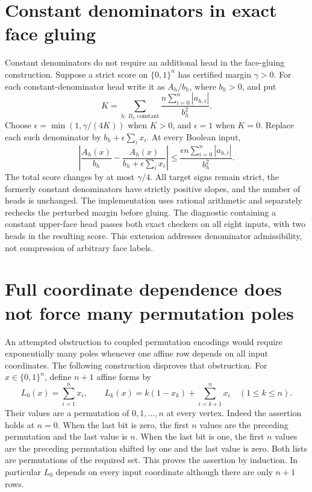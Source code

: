 \documentclass[11pt]{article}
\begin{document}
\section{Constant denominators in exact face gluing}

Constant denominators do not require an additional head in the face-gluing
construction. Suppose a strict score on $\{0,1\}^n$ has certified margin
$\gamma>0$. For each constant-denominator head write it as $A_h/b_h$,
where $b_h>0$, and put
\[
 K=\sum_{h:\,B_h\text{ constant}}\frac{n\sum_{i=0}^n|a_{h,i}|}{b_h^2}.
\]
Choose $\epsilon=\min(1,\gamma/(4K))$ when $K>0$, and $\epsilon=1$
when $K=0$. Replace each such denominator by
$b_h+\epsilon\sum_i x_i$. At every Boolean input,
\[
 \left|\frac{A_h(x)}{b_h}-\frac{A_h(x)}{b_h+\epsilon\sum_i x_i}\right|
 \le\frac{\epsilon n\sum_{i=0}^n|a_{h,i}|}{b_h^2}.
\]
The total score changes by at most $\gamma/4$. All target signs remain
strict, the formerly constant denominators have strictly positive slopes,
and the number of heads is unchanged. The implementation uses rational
arithmetic and separately rechecks the perturbed margin before gluing.
The diagnostic containing a constant upper-face head passes both exact
checkers on all eight inputs, with two heads in the resulting score.
This extension addresses denominator admissibility, not compression of
arbitrary face labels.


\section{Full coordinate dependence does not force many permutation poles}

An attempted obstruction to coupled permutation encodings would require
exponentially many poles whenever one affine row depends on all input
coordinates. The following construction disproves that obstruction.
For $x\in\{0,1\}^n$, define $n+1$ affine forms by
\[
 L_0(x)=\sum_{i=1}^n x_i,\qquad
 L_k(x)=k(1-x_k)+\sum_{i=k+1}^n x_i\quad(1\le k\le n).
\]
Their values are a permutation of $0,1,\ldots,n$ at every vertex.
Indeed the assertion holds at $n=0$. When the last bit is zero, the
first $n$ values are the preceding permutation and the last value is
$n$. When the last bit is one, the first $n$ values are the preceding
permutation shifted by one and the last value is zero. Both lists are
permutations of the required set. This proves the assertion by induction.
In particular $L_0$ depends on every input coordinate although there
are only $n+1$ rows.
\end{document}
